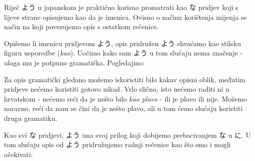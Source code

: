 
\author{Tomislav Mamić}

	
	
	
	Riječ よう u japanskom je praktično korisno promatrati kao な pridjev koji s lijeve strane opisujemo kao da je imenica. Ovisno o načinu korištenja mijenja se način na koji povezujemo opis s ostatkom rečenice.
	
	
	Opišemo li imenicu pridjevom よう, opis pridružen よう shvaćamo kao stilsku figuru usporedbe (\textit{kao}). Uočimo kako sam よう u tom slučaju nema značenje - uloga mu je potpuno gramatička. Pogledajmo:
	
	\begin{reibun}
	\end{reibun}

	Za opis gramatički gledano možemo iskoristiti bilo kakav opisni oblik, međutim pridjeve nećemo koristiti gotovo nikad. Vrlo slično, isto nećemo raditi ni u hrvatskom - nećemo reći da je nešto bilo \textit{kao plavo} - ili je plavo ili nije. Možemo naravno, reći da nam se čini da je nešto plavo, ali u tom ćemo slučaju koristiti drugu gramatiku\footnotemark[2].
	
	
	
	Kao svi な pridjevi, よう ima svoj prilog koji dobijemo prebacivanjem な u に. U tom slučaju opis od よう pridružujemo radnji rečenice kao što smo i mogli očekivati:
	
